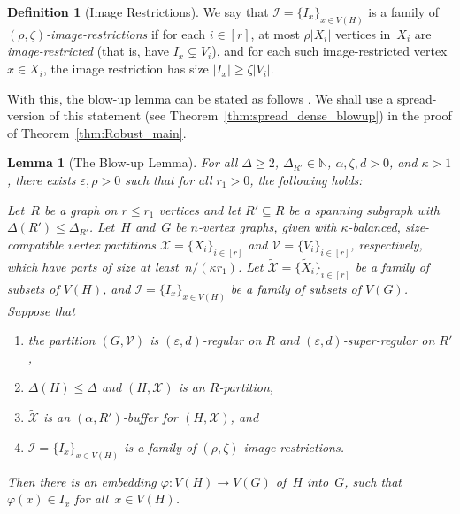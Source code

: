 \documentclass[final]{article}
\def\mcite[#1]#2{\mbox{\cite[#1]{#2}}}
\newtheorem{lemma}[theorem]{Lemma}
\theoremstyle{definition}
\newtheorem{definition}[theorem]{Definition}
\newcommand{\itmarab}[1]{\mbox{\rm 
({\it #1}\,\arabic{*}\hspace{0.05em})}}
\newcommand{\eps}{\varepsilon}
\let\tilde\widetilde
\begin{document}
\begin{definition}[Image Restrictions]
    We say that $\mathcal{I} = \{I_x\}_{x \in V(H)}$ is a family of \emph{$(\rho, \zeta)$-image-restrictions} if for each $i \in [r]$, at most $\rho|X_i|$ vertices in~$X_i$ are \emph{image-restricted} (that is, have $I_x \subsetneq V_i$), and for each such image-restricted vertex $x \in X_i$, the image restriction has size $|I_x| \geq \zeta |V_i|$. 
\end{definition}

With this, the blow-up lemma can be stated as follows \mcite[Lemma 7.1]{sparse_blowup}. We shall use a spread-version of this statement (see Theorem~\ref{thm:spread_dense_blowup}) in the proof of Theorem~\ref{thm:Robust_main}.

\begin{lemma}[The Blow-up Lemma]\label{lem:dense_blowup}
  For all $\Delta\ge 2$, $\Delta_{R'} \in \mathbb{N}$, $\alpha, \zeta, d>0$, and ${\kappa>1}$, there exists $\eps, \rho > 0$ such that for all $r_1 > 0$, the following holds: 
  
  Let~$R$ be a graph on $r\le r_1$ vertices and let $R'\subseteq R$ be a spanning subgraph with $\Delta(R')\leq \Delta_{R'}$. Let~$H$ and~$G$ be $n$-vertex graphs, given with $\kappa$-balanced, size-compatible vertex partitions $\mathcal{X}=\{X_i\}_{i\in[r]}$ and $\mathcal{V}=\{V_i\}_{i\in[r]}$, respectively, which have parts of size at
  least~$n/(\kappa r_1)$. Let 
  $\tilde{\mathcal{X}}=\{\tilde{X}_i\}_{i\in[r]}$ be a family of subsets of $V(H)$, and $\mathcal{I} = \{I_x\}_{x \in V(H)}$ be a family of subsets of $V(G)$.  
  Suppose that
  \begin{enumerate}[label=\itmarab{BL}]
  \item \label{itm:BL1} the partition $(G,\mathcal{V})$ is $(\eps,d)$-regular on $R$ and $(\eps,d)$-super-regular on $R'$,
  \item \label{itm:BL2} $\Delta(H)\leq \Delta$ and $(H,\mathcal{X})$ is an $R$-partition,
  \item \label{itm:BL3} $\tilde{\mathcal{X}}$ is an $(\alpha,R')$-buffer for $(H,\mathcal{X})$, and
  \item \label{itm:BL4} $\mathcal{I} = \{I_x\}_{x \in V(H)}$ is a family of $(\rho, \zeta)$-image-restrictions. 
  \end{enumerate}
  
  \noindent Then there is an embedding $\varphi \colon V(H)\to V(G)$ of~$H$ into~$G$, such that~$\varphi(x) \in I_x$ for all~$x \in V(H)$.
\end{lemma}
\end{document}
